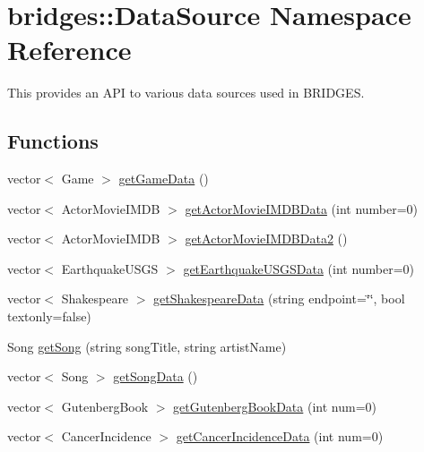 \hypertarget{namespacebridges_1_1_data_source}{}\section{bridges\+:\+:Data\+Source Namespace Reference}
\label{namespacebridges_1_1_data_source}


This provides an A\+PI to various data sources used in B\+R\+I\+D\+G\+ES.  


\subsection*{Functions}
\begin{DoxyCompactItemize}
\item 
vector$<$ Game $>$ \mbox{\hyperlink{namespacebridges_1_1_data_source_a96a28cc7f2a6013fe09b07cc53c7432f}{get\+Game\+Data}} ()
\item 
vector$<$ Actor\+Movie\+I\+M\+DB $>$ \mbox{\hyperlink{namespacebridges_1_1_data_source_ac43ccd8f2a325cf2f057a5ee7f0b73f1}{get\+Actor\+Movie\+I\+M\+D\+B\+Data}} (int number=0)
\item 
vector$<$ Actor\+Movie\+I\+M\+DB $>$ \mbox{\hyperlink{namespacebridges_1_1_data_source_a022113cbb28042171d088250e85098d0}{get\+Actor\+Movie\+I\+M\+D\+B\+Data2}} ()
\item 
vector$<$ Earthquake\+U\+S\+GS $>$ \mbox{\hyperlink{namespacebridges_1_1_data_source_ae9f6a40dae8b8a15ebe43aca34931b43}{get\+Earthquake\+U\+S\+G\+S\+Data}} (int number=0)
\item 
vector$<$ Shakespeare $>$ \mbox{\hyperlink{namespacebridges_1_1_data_source_a2aa0d50a0b7bf8cc47c4f92dd1986dc6}{get\+Shakespeare\+Data}} (string endpoint=\char`\"{}\char`\"{}, bool textonly=false)
\item 
Song \mbox{\hyperlink{namespacebridges_1_1_data_source_a284c9d572415b67df6989ab8ab97d0e2}{get\+Song}} (string song\+Title, string artist\+Name)
\item 
vector$<$ Song $>$ \mbox{\hyperlink{namespacebridges_1_1_data_source_a325b6f25041e833bc2fd561bd2c2ee6e}{get\+Song\+Data}} ()
\item 
vector$<$ Gutenberg\+Book $>$ \mbox{\hyperlink{namespacebridges_1_1_data_source_a8146b00565286727e8206e377d9ff5bd}{get\+Gutenberg\+Book\+Data}} (int num=0)
\item 
vector$<$ Cancer\+Incidence $>$ \mbox{\hyperlink{namespacebridges_1_1_data_source_a4f8990ea0e793a6464d95cb82f57c8f9}{get\+Cancer\+Incidence\+Data}} (int num=0)
\end{DoxyCompactItemize}


